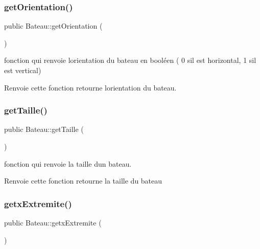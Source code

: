 \subsubsection{\texorpdfstring{get\+Orientation()}{getOrientation()}}
{\footnotesize\ttfamily public Bateau\+::get\+Orientation (\begin{DoxyParamCaption}{ }\end{DoxyParamCaption})}



fonction qui renvoie l\textquotesingle{}orientation du bateau en booléen ( 0 s\textquotesingle{}il est horizontal, 1 s\textquotesingle{}il est vertical) 

\begin{DoxyReturn}{Renvoie}
cette fonction retourne l\textquotesingle{}orientation du bateau. 
\end{DoxyReturn}
\mbox{\label{class_bateau_a9f0b81c06a5760d0aa40bed0cb9d2a58}} 
\subsubsection{\texorpdfstring{get\+Taille()}{getTaille()}}
{\footnotesize\ttfamily public Bateau\+::get\+Taille (\begin{DoxyParamCaption}{ }\end{DoxyParamCaption})}



fonction qui renvoie la taille d\textquotesingle{}un bateau. 

\begin{DoxyReturn}{Renvoie}
cette fonction retourne la taille du bateau 
\end{DoxyReturn}
\mbox{\label{class_bateau_ad8a7212a50596757a10a429ed69400ce}} 
\subsubsection{\texorpdfstring{getx\+Extremite()}{getxExtremite()}}
{\footnotesize\ttfamily public Bateau\+::getx\+Extremite (\begin{DoxyParamCaption}{ }\end{DoxyParamCaption})}



